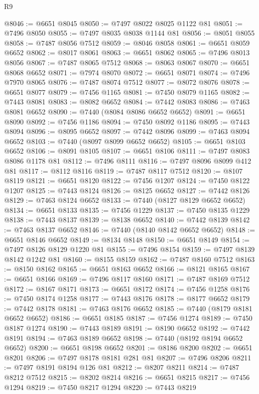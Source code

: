 \begin{lexlean}{R9}
\begin{coremodule}
@8046 := @6651 @8045
@8050 := @7497 @8022 @8025 @1122 @81
@8051 := @7496 @8050
@8055 := @7497 @8035 @8038 @1144 @81
@8056 := @8051 @8055
@8058 := @7487 @8056 @7512
@8059 := @8046 @8058
@8061 := @6651 @8059 @6652
@8062 := @8017 @8061
@8063 := @6651 @8062
@8065 := @7496 @8013 @8056
@8067 := @7487 @8065 @7512
@8068 := @8063 @8067
@8070 := @6651 @8068 @6652
@8071 := @7974 @8070
@8072 := @6651 @8071
@8074 := @7496 @7970 @8065
@8076 := @7487 @8074 @7512
@8077 := @8072 @8076
@8078 := @6651 @8077
@8079 := @7456 @1165
@8081 := @7450 @8079 @1165
@8082 := @7443 @8081
@8083 := @8082 @6652
@8084 := @7442 @8083
@8086 := @7463 @8081 @6652
@8090 := @7440 (@8084 @8086 @6652 @6652)
@8091 := @6651 @8090
@8092 := @7456 @1186
@8094 := @7450 @8092 @1186
@8095 := @7443 @8094
@8096 := @8095 @6652
@8097 := @7442 @8096
@8099 := @7463 @8094 @6652
@8103 := @7440 (@8097 @8099 @6652 @6652)
@8105 := @6651 @8103 @6652
@8106 := @8091 @8105
@8107 := @6651 @8106
@8111 := @7497 @8083 @8086 @1178 @81
@8112 := @7496 @8111
@8116 := @7497 @8096 @8099 @412 @81
@8117 := @8112 @8116
@8119 := @7487 @8117 @7512
@8120 := @8107 @8119
@8121 := @6651 @8120
@8122 := @7456 @1207
@8124 := @7450 @8122 @1207
@8125 := @7443 @8124
@8126 := @8125 @6652
@8127 := @7442 @8126
@8129 := @7463 @8124 @6652
@8133 := @7440 (@8127 @8129 @6652 @6652)
@8134 := @6651 @8133
@8135 := @7456 @1229
@8137 := @7450 @8135 @1229
@8138 := @7443 @8137
@8139 := @8138 @6652
@8140 := @7442 @8139
@8142 := @7463 @8137 @6652
@8146 := @7440 (@8140 @8142 @6652 @6652)
@8148 := @6651 @8146 @6652
@8149 := @8134 @8148
@8150 := @6651 @8149
@8154 := @7497 @8126 @8129 @1220 @81
@8155 := @7496 @8154
@8159 := @7497 @8139 @8142 @1242 @81
@8160 := @8155 @8159
@8162 := @7487 @8160 @7512
@8163 := @8150 @8162
@8165 := @6651 @8163 @6652
@8166 := @8121 @8165
@8167 := @6651 @8166
@8169 := @7496 @8117 @8160
@8171 := @7487 @8169 @7512
@8172 := @8167 @8171
@8173 := @6651 @8172
@8174 := @7456 @1258
@8176 := @7450 @8174 @1258
@8177 := @7443 @8176
@8178 := @8177 @6652
@8179 := @7442 @8178
@8181 := @7463 @8176 @6652
@8185 := @7440 (@8179 @8181 @6652 @6652)
@8186 := @6651 @8185
@8187 := @7456 @1274
@8189 := @7450 @8187 @1274
@8190 := @7443 @8189
@8191 := @8190 @6652
@8192 := @7442 @8191
@8194 := @7463 @8189 @6652
@8198 := @7440 (@8192 @8194 @6652 @6652)
@8200 := @6651 @8198 @6652
@8201 := @8186 @8200
@8202 := @6651 @8201
@8206 := @7497 @8178 @8181 @281 @81
@8207 := @7496 @8206
@8211 := @7497 @8191 @8194 @126 @81
@8212 := @8207 @8211
@8214 := @7487 @8212 @7512
@8215 := @8202 @8214
@8216 := @6651 @8215
@8217 := @7456 @1294
@8219 := @7450 @8217 @1294
@8220 := @7443 @8219

\end{coremodule}
\end{lexlean}
